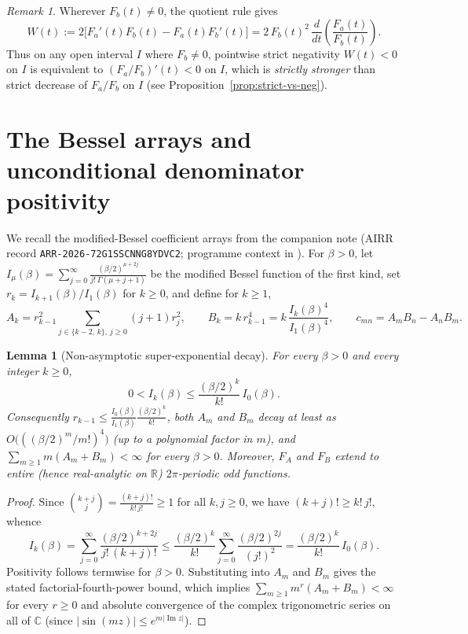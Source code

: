 \documentclass[11pt]{article}
\newtheorem{lemma}[theorem]{Lemma}
\theoremstyle{remark}
\newtheorem{remark}[theorem]{Remark}
\begin{document}
\begin{remark}
Wherever $F_b(t) \neq 0$, the quotient rule gives
\[
W(t) := 2\bigl[F_a'(t) F_b(t) - F_a(t) F_b'(t)\bigr]
= 2\,F_b(t)^2\,\frac{d}{dt}\!\left(\frac{F_a(t)}{F_b(t)}\right).
\]
Thus on any open interval $I$ where $F_b \neq 0$, pointwise strict negativity $W(t) < 0$
on $I$ is equivalent to $(F_a/F_b)'(t) < 0$ on $I$, which is \emph{strictly stronger} than
strict decrease of $F_a/F_b$ on $I$ (see Proposition~\ref{prop:strict-vs-neg}).
\end{remark}

\section{The Bessel arrays and unconditional denominator positivity}
\label{sec:surface}

We recall the modified-Bessel coefficient arrays from the companion note \cite{PhiLemma}
(AIRR record \texttt{ARR-2026-72G1SSCNNG8YDVC2}; programme context in \cite{MasterMap}).
For $\beta > 0$, let $I_\mu(\beta) = \sum_{j=0}^\infty \frac{(\beta/2)^{\mu+2j}}{j!\,\Gamma(\mu+j+1)}$
be the modified Bessel function of the first kind, set $r_k = I_{k+1}(\beta)/I_1(\beta)$ for
$k \ge 0$, and define for $k \ge 1$,
\[
A_k = r_{k-1}^2 \!\!\sum_{j \in \{k-2,\,k\},\, j \ge 0}\!\! (j+1) r_j^2,
\qquad
B_k = k\, r_{k-1}^4 = k\,\frac{I_k(\beta)^4}{I_1(\beta)^4},
\qquad
c_{mn} = A_m B_n - A_n B_m .
\]

\begin{lemma}[Non-asymptotic super-exponential decay]
\label{lem:bessel-decay}
For every $\beta > 0$ and every integer $k \ge 0$,
\[
0 < I_k(\beta) \le \frac{(\beta/2)^k}{k!}\,I_0(\beta).
\]
Consequently $r_{k-1} \le \frac{I_0(\beta)}{I_1(\beta)}\frac{(\beta/2)^k}{k!}$, both $A_m$
and $B_m$ decay at least as $O\bigl(((\beta/2)^m/m!)^4\bigr)$ (up to a polynomial factor
in $m$), and $\sum_{m\ge 1} m(A_m + B_m) < \infty$ for every $\beta > 0$. Moreover, $F_A$
and $F_B$ extend to entire (hence real-analytic on $\mathbb{R}$) $2\pi$-periodic odd
functions.
\end{lemma}

\begin{proof}
Since $\binom{k+j}{j} = \frac{(k+j)!}{k!\,j!} \ge 1$ for all $k,j \ge 0$, we have
$(k+j)! \ge k!\,j!$, whence
\[
I_k(\beta) = \sum_{j=0}^\infty \frac{(\beta/2)^{k+2j}}{j!\,(k+j)!}
\le \frac{(\beta/2)^k}{k!}\sum_{j=0}^\infty \frac{(\beta/2)^{2j}}{(j!)^2}
= \frac{(\beta/2)^k}{k!}\,I_0(\beta).
\]
Positivity follows termwise for $\beta > 0$. Substituting into $A_m$ and $B_m$ gives the
stated factorial-fourth-power bound, which implies $\sum_{m\ge 1} m^r (A_m + B_m) < \infty$
for every $r \ge 0$ and absolute convergence of the complex trigonometric series on all of
$\mathbb{C}$ (since $|\sin(mz)| \le e^{m|\operatorname{Im} z|}$).
\end{proof}
\end{document}
